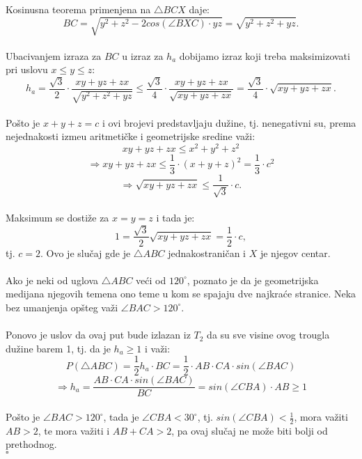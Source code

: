 \documentclass[11pt,letter]{article}
\begin{document}
\indent Kosinusna teorema primenjena na $\bigtriangleup BCX$ daje:
\\
$$BC=\sqrt{y^2+z^2-2cos(\angle BXC)\cdot yz}=\sqrt{y^2+z^2+yz}.$$
\\
\indent Ubacivanjem izraza za $BC$ u izraz za $h_a$ dobijamo izraz koji treba maksimizovati  pri uslovu $x\leqslant y\leqslant z$:
$$h_a=\frac{\sqrt3}{2}\cdot \frac{xy+yz+zx}{\sqrt{y^2+z^2+yz}}\leqslant \frac{\sqrt3}{4}\cdot \frac{xy+yz+zx}{\sqrt{xy+yz+zx}}=\frac{\sqrt3}{4}\cdot \sqrt{xy+yz+zx}.$$
\\
\indent Po\v sto je $x+y+z=c$ i ovi brojevi predstavljaju du\v zine, tj. nenegativni su, prema nejednakosti izme\dj u aritmeti\v cke i geometrijske sredine va\v zi:
$$xy+yz+zx\leqslant x^2+y^2+z^2$$
$$\Longrightarrow xy+yz+zx\leqslant \frac{1}{3}\cdot (x+y+z)^2=\frac{1}{3}\cdot c^2$$
$$\Longrightarrow \sqrt{xy+yz+zx}\leqslant \frac{1}{\sqrt3}\cdot c.$$
\\
\indent Maksimum se dosti\v ze za $x=y=z$ i tada je:
$$1=\frac{\sqrt3}{2}\sqrt{xy+yz+zx}=\frac{1}{2}\cdot c,$$
tj. $c=2$. Ovo je slu\v caj gde je $\bigtriangleup ABC$ jednakostrani\v can i $X$ je njegov centar.
\\
\\
\indent Ako je neki od uglova $\bigtriangleup ABC$ ve\' ci od $120^\circ$, poznato je da je geometrijska medijana njegovih temena ono teme u kom se spajaju dve najkra\' ce stranice. Neka bez umanjenja op\v steg va\v zi $\angle BAC>120^\circ$.
\\
\\
\indent Ponovo je uslov da ovaj put bude izlazan iz $T_2$ da su sve visine ovog trougla du\v zine barem 1, tj. da je $h_a\geqslant 1$ i va\v zi:
$$P(\bigtriangleup ABC)=\frac{1}{2} h_a \cdot BC=\frac{1}{2} \cdot AB\cdot CA \cdot sin(\angle BAC)$$
$$\Longrightarrow h_a=\frac{ AB\cdot CA \cdot sin(\angle BAC)}{BC}=sin(\angle CBA)\cdot AB\geqslant 1$$
\\
\indent Po\v sto je $\angle BAC>120^\circ$, tada je $\angle CBA<30^\circ$, tj. $sin(\angle CBA)<\frac{1}{2}$, mora va\v ziti $AB>2$, te mora va\v ziti i $AB+CA>2$, pa ovaj slu\v caj ne mo\v ze biti bolji od prethodnog.
\\
$\square$
\bigskip
\bigskip
\end{document}
